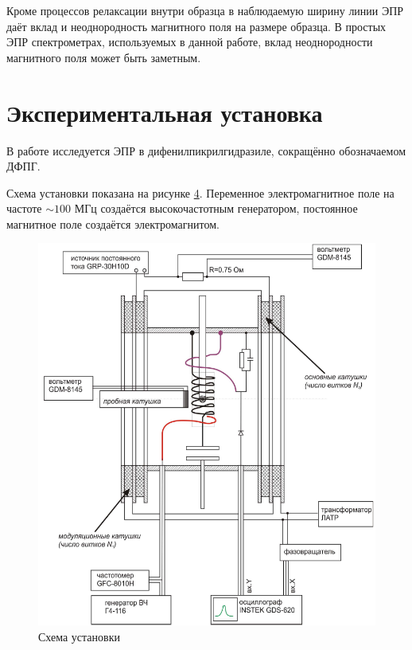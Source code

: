 \documentclass[a4paper,12pt]{article}
\begin{document}
Кроме процессов релаксации внутри образца в наблюдаемую ширину линии ЭПР даёт вклад
и неоднородность магнитного поля на размере образца. В простых ЭПР спектрометрах,
используемых в данной работе, вклад неоднородности магнитного поля может быть
заметным.

\section{Экспериментальная установка}
В работе исследуется ЭПР в дифенилпикрилгидразиле, сокращённо обозначаемом ДФПГ.

Схема установки показана на рисунке \hyperref[fig: Exp setup]{4}. Переменное электромагнитное поле на частоте $\sim100$ МГц создаётся высокочастотным генератором, постоянное магнитное поле создаётся электромагнитом.
\begin{figure}\label{fig: Exp setup}
    \centering
    \includegraphics[width = \textwidth]{Exp setup.png}
    \caption{Схема установки}
\end{figure}
\end{document}
